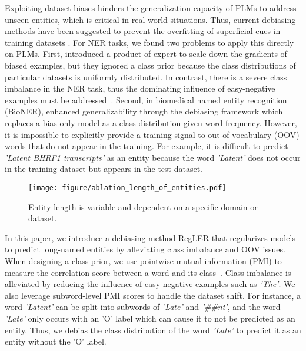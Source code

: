 \documentclass[11pt]{article}
\begin{document}
Exploiting dataset biases hinders the generalization capacity of PLMs to address unseen entities, which is critical in real-world situations.
Thus, current debiasing methods have been suggested to prevent the overfitting of superficial cues in training datasets \cite{clark2019don, kim2021your}.
For NER tasks, we found two problems to apply this directly on PLMs.
First, \citet{clark2019don} introduced a product-of-expert to scale down the gradients of biased examples, but they ignored a class prior because the class distributions of particular datasets is uniformly distributed.
In contrast, there is a severe class imbalance in the NER task, thus the dominating influence of easy-negative examples must be addressed~\cite{meng2019dsreg,li2020dice,mahabadi2020end}.
Second, in biomedical named entity recognition (BioNER), \citet{kim2021your} enhanced generalizability through the debiasing framework which replaces a bias-only model as a class distribution given word frequency.
However, it is impossible to explicitly provide a training signal to out-of-vocabulary (OOV) words that do not appear in the training.
For example, it is difficult to predict \textit{'Latent BHRF1 transcripts'} as an entity because the word \textit{'Latent'} does not occur in the training dataset but appears in the test dataset.

\begin{figure}[]
 \centering
 \texttt{[image: figure/ablation\_length\_of\_entities.pdf]}
\caption{Entity length is variable and dependent on a specific domain or dataset.}
 \label{fig:ablation length of entities}
\end{figure}

In this paper, we introduce a debiasing method RegLER that regularizes models to predict long-named entities by alleviating class imbalance and OOV issues.
When designing a class prior, we use pointwise mutual information (PMI) to measure the correlation score between a word and its class~\cite{gururangan2018annotation}.
Class imbalance is alleviated by reducing the influence of easy-negative examples such as \textit{'The'}.
We also leverage subword-level PMI scores to handle the dataset shift.
For instance, a word \textit{'Latent'} can be split into subwords of \textit{'Late'} and \textit{'\#\#nt'}, and the word \textit{'Late'} only occurs with an 'O' label which can cause it to not be predicted as an entity.
Thus, we debias the class distribution of the word \textit{'Late'} to predict it as an entity without the 'O' label.
\end{document}
